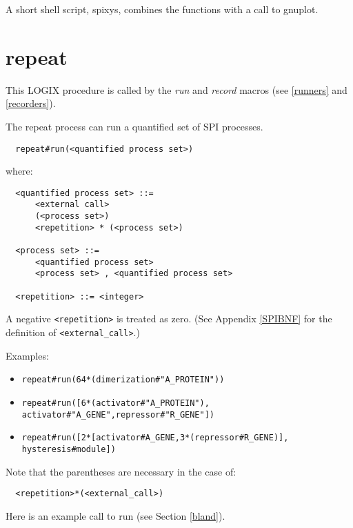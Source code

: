 \noindent
A short shell script, spixys, combines the functions with a call to gnuplot.

\section{repeat}
\label{repeat}
This LOGIX procedure is called by the {\em run} and
{\em record} macros (see \ref{runners} and
\ref{recorders}).

\noindent
The repeat process can run a quantified set of SPI
processes.

\begin{verbatim}
  repeat#run(<quantified process set>)
\end{verbatim}

\noindent
where:

\begin{verbatim}
  <quantified process set> ::=
      <external call>
      (<process set>)
      <repetition> * (<process set>)

  <process set> ::=
      <quantified process set>
      <process set> , <quantified process set>

  <repetition> ::= <integer>
\end{verbatim}

\noindent
A negative \verb+<repetition>+ is treated as zero.
\noindent
(See Appendix \ref{SPIBNF} for the definition of \verb+<external_call>+.)

\noindent
Examples:

\begin{itemize}
\item
\verb+repeat#run(64*(dimerization#"A_PROTEIN"))+
\item
\verb+repeat#run([6*(activator#"A_PROTEIN"),+ \linebreak
\verb+            activator#"A_GENE",repressor#"R_GENE"])+
\item
\verb+repeat#run([2*[activator#A_GENE,3*(repressor#R_GENE)],+ \linebreak
\verb+            hysteresis#module])+
\end{itemize}

\noindent
Note that the parentheses are necessary in the case of:

\begin{verbatim}
  <repetition>*(<external_call>)
\end{verbatim}

\noindent
Here is an example call to run (see Section \ref{bland}).

